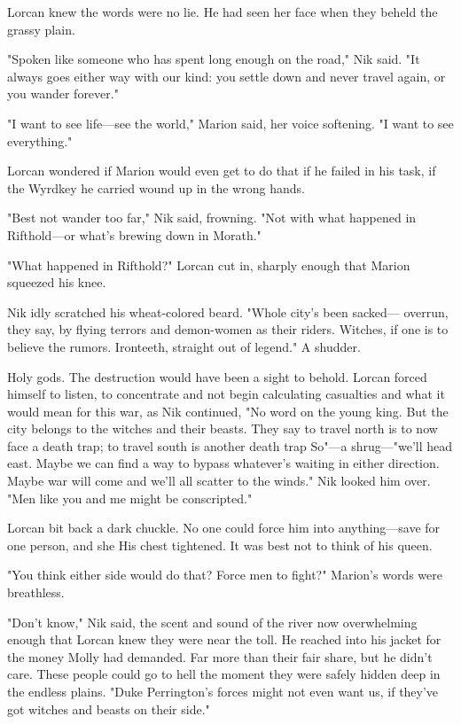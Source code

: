 Lorcan knew the words were no lie. He had seen her face when they beheld the grassy plain.

"Spoken like someone who has spent long enough on the road," Nik said. "It always goes either way with our kind: you settle down and never travel again, or you wander forever."

"I want to see life---see the world," Marion said, her voice softening. "I want to see everything."

Lorcan wondered if Marion would even get to do that if he failed in his task, if the Wyrdkey he carried wound up in the wrong hands.

"Best not wander too far," Nik said, frowning. "Not with what happened in Rifthold---or what's brewing down in Morath."

"What happened in Rifthold?" Lorcan cut in, sharply enough that Marion squeezed his knee.

Nik idly scratched his wheat-colored beard. "Whole city's been sacked--- overrun, they say, by flying terrors and demon-women as their riders. Witches, if one is to believe the rumors. Ironteeth, straight out of legend." A shudder.

Holy gods. The destruction would have been a sight to behold. Lorcan forced himself to listen, to concentrate and not begin calculating casualties and what it would mean for this war, as Nik continued, "No word on the young king. But the city belongs to the witches and their beasts. They say to travel north is to now face a death trap; to travel south is another death trap  So"---a shrug---"we'll head east. Maybe we can find a way to bypass whatever's waiting in either direction. Maybe war will come and we'll all scatter to the winds." Nik looked him over. "Men like you and me might be conscripted."

Lorcan bit back a dark chuckle. No one could force him into anything---save for one person, and she  His chest tightened. It was best not to think of his queen.

"You think either side would do that? Force men to fight?" Marion's words were breathless.

"Don't know," Nik said, the scent and sound of the river now overwhelming enough that Lorcan knew they were near the toll. He reached into his jacket for the money Molly had demanded. Far more than their fair share, but he didn't care. These people could go to hell the moment they were safely hidden deep in the endless plains. "Duke Perrington's forces might not even want us, if they've got witches and beasts on their side."


